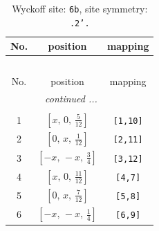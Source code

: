 \documentclass[fleqn,8pt]{jsarticle}
\begin{document}
\begin{longtable}{ccc}
\caption{Wyckoff site: {\tt 6b}, site symmetry: {\tt .2'.}}
 \\
 \hline \hline
No. & position & mapping \\ \hline \endfirsthead

\multicolumn{2}{l}{\tablename\ \thetable{}} \\
 \hline \hline
No. & position & mapping \\ \hline \endhead

 \hline \hline
\multicolumn{2}{r}{\footnotesize\it continued ...} \\ \endfoot

 \hline \hline
\multicolumn{2}{r}{} \\ \endlastfoot

1 & $\left[ x,\, 0,\, \frac{5}{12} \right]$ & {\tt [1,10]} \\ \hline
2 & $\left[ 0,\, x,\, \frac{1}{12} \right]$ & {\tt [2,11]} \\ \hline
3 & $\left[ - x,\, - x,\, \frac{3}{4} \right]$ & {\tt [3,12]} \\ \hline
4 & $\left[ x,\, 0,\, \frac{11}{12} \right]$ & {\tt [4,7]} \\ \hline
5 & $\left[ 0,\, x,\, \frac{7}{12} \right]$ & {\tt [5,8]} \\ \hline
6 & $\left[ - x,\, - x,\, \frac{1}{4} \right]$ & {\tt [6,9]} \\
\end{longtable}
\renewcommand{\arraystretch}{1.2}
\end{document}
